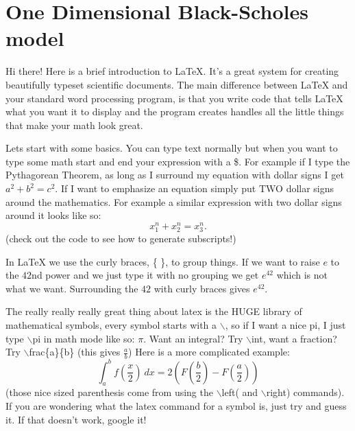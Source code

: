 \documentclass[12pt]{article}
\begin{document}
 
%

 
\section{One Dimensional Black-Scholes model}
Hi there! Here is a brief introduction to LaTeX. It's a great system for creating beautifully typeset scientific documents. The main difference between LaTeX and your standard word processing program, is that you write code that tells LaTeX what you want it to display and the program creates handles all the little things that make your math look great.

Lets start with some basics. You can type text normally but when you want to type some math start and end your expression with a \$. For example if I type the Pythagorean Theorem, as long as I surround my equation with dollar signs I get $a^2 +b^2 = c^2$. If I want to emphasize an equation simply put TWO dollar signs around the mathematics. For example a similar expression with two dollar signs around it looks like so: $$x_1^n + x_2^n = x_3^n.$$ (check out the code to see how to generate subscripts!)

In LaTeX we use the curly braces, \{ \}, to group things. If we want to raise $e$ to the $42$nd power and we just type it with no grouping we get $e^42$ which is not what we want. Surrounding the $42$ with curly braces gives $e^{42}$.

The really really really great thing about latex is the HUGE library of mathematical symbols, every symbol starts with a $\backslash$, so if I want a nice pi, I just type $\backslash$pi in math mode like so: $\pi$. Want an integral? Try $\backslash$int, want a fraction? Try $\backslash$frac\{a\}\{b\} (this gives $\frac{a}{b}$) Here is a more complicated example:
$$
\int_a^b f \left(\frac{x}{2} \right) \ dx =2\left( F\left(\frac{b}{2} \right) - F\left(\frac{a}{2}\right) \right)
$$
(those nice sized parenthesis come from using the $\backslash$left( and $\backslash$right) commands). If you are wondering what the latex command for a symbol is, just try and guess it. If that doesn't work, google it!
\end{document}
